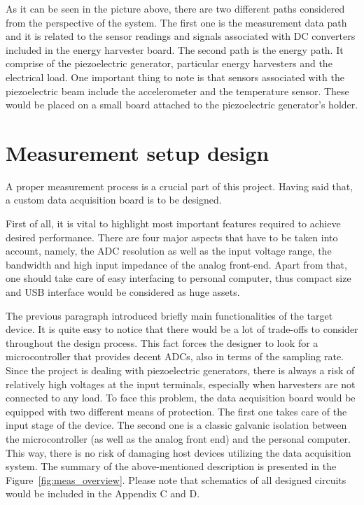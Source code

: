 \documentclass[12pt,a4paper]{article}
\begin{document}
As it can be seen in the picture above, there are two different paths considered from the perspective of the system. The first one is the measurement data path and it is related to the sensor readings and signals associated with DC converters included in the energy harvester board. The second path is the energy path. It comprise of the piezoelectric generator, particular energy harvesters and the electrical load. One important thing to note is that sensors associated with the piezoelectric beam include the accelerometer and the temperature sensor. These would be placed on a small board attached to the piezoelectric generator's holder.


\FloatBarrier

\section{Measurement setup design}


A proper measurement process is a crucial part of this project. Having said that, a custom data acquisition board is to be designed. 
\par

First of all, it is vital to highlight most important features required to achieve desired performance. There are four major aspects that have to be taken into account, namely, the ADC resolution as well as the input voltage range, the bandwidth and high input impedance of the analog front-end. Apart from that, one should take care of easy interfacing to personal computer, thus compact size and USB interface would be considered as huge assets.
\par
The previous paragraph introduced briefly main functionalities of the target device. It is quite easy to notice that there would be a lot of trade-offs to consider throughout the design process. This fact forces the designer to look for a microcontroller that provides decent ADCs, also in terms of the sampling rate. Since the project is dealing with piezoelectric generators, there is always a risk of relatively high voltages at the input terminals, especially when harvesters are not connected to any load. To face this problem, the data acquisition board would be equipped with two different means of protection. The first one takes care of the input stage of the device. The second one is a classic galvanic isolation between the microcontroller (as well as the analog front end) and the personal computer. This way, there is no risk of damaging host devices utilizing the data acquisition system. The summary of the above-mentioned description is presented in the Figure~\ref{fig:meas_overview}. Please note that schematics of all designed circuits would be included in the Appendix C and D.\par
\end{document}
